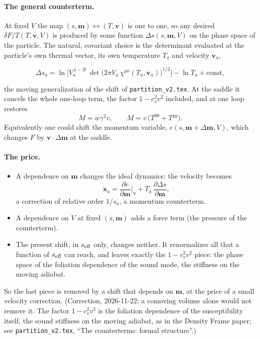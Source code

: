 \documentclass[11pt,aps,preprint,nofootinbib,superscriptaddress,tightenlines]{revtex4-2}
\def\st{\begin{equation}}
\def\stp{\end{equation}}
\let\oldparagraph\paragraph
\renewcommand{\paragraph}{\par\bigskip\oldparagraph}
\begin{document}
\paragraph{The general counterterm.}  At fixed $V$ the map $(s,\bm m)\leftrightarrow(T,\bm v)$ is one to one, so any desired $\delta F/T(T,\bm v,V)$ is produced by some function
$\Delta s(s,\bm m,V)$ on the phase space of the particle.  The natural, covariant choice is the determinant evaluated at the particle's own thermal vector, its own
temperature $T_a$ and velocity $\bm v_a$,
\begin{keyeq}
\st
\Delta s_a=\ln\Big[V_a^{\,1-\mathcal B}\,\det\big(2\pi V_a\,\chi^{\mu\nu}(T_a,\bm v_a)\big)^{1/2}\Big]-\ln T_a+\text{const} ,
\stp
\end{keyeq}
the moving generalization of the shift of \nolinkurl{partition_v2.tex}.  At the saddle it cancels the whole one-loop term, the factor $1-c_s^2v^2$ included, and at one
loop restores
\st
M=w\gamma^2v,\qquad M=v\,\big(T^{00}+T^{yy}\big) .
\stp
Equivalently one could shift the momentum variable, $e(s,\bm m+\Delta\bm m,V)$, which changes $F$ by $\bm v\cdot\Delta\bm m$ at the saddle.

\paragraph{The price.}
\begin{itemize}
\item A dependence on $\bm m$ changes the ideal dynamics: the velocity becomes
  \st
  \dot{\bm x}_a=\frac{\partial e}{\partial\bm m}\Big|_u+T_a\,\frac{\partial\Delta s}{\partial\bm m} ,
  \stp
  a correction of relative order $1/s_a$, a momentum counterterm.
\item A dependence on $V$ at fixed $(s,\bm m)$ adds a force term (the pressure of the counterterm).
\item The present shift, in $s_{\rm eff}$ only, changes neither.  It renormalizes all that a function of $s_{\rm eff}$ can reach, and leaves exactly the $1-c_s^2v^2$ piece: the phase space of
  the foliation dependence of the sound mode, the stiffness on the moving adiabat.
\end{itemize}
So the last piece is removed by a shift that depends on $\bm m$, at the price of a small velocity correction.  (Correction, 2026-11-22: a comoving volume alone would
not remove it.  The factor $1-c_s^2v^2$ is the foliation dependence of the susceptibility itself, the sound stiffness on the moving adiabat, as in the Density Frame
paper; see \nolinkurl{partition_v2.tex}, ``The counterterms: formal structure''.)
\end{document}
